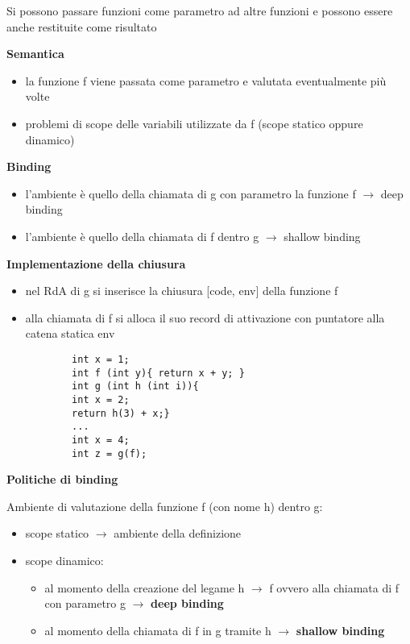 \documentclass{article}
\begin{document}
\begin{flushleft}

Si possono passare funzioni come parametro ad altre funzioni e possono essere anche restituite come risultato

\medskip

\textbf{Semantica}
\begin{itemize}
    \item la funzione f viene passata come parametro e valutata eventualmente più volte
    \item problemi di scope delle variabili utilizzate da f (scope statico oppure dinamico)
\end{itemize}

\medskip

\textbf{Binding}
\begin{itemize}
    \item l'ambiente è quello della chiamata di g con parametro la funzione f $\rightarrow$ deep binding
    \item l'ambiente è quello della chiamata di f dentro g $\rightarrow$ shallow binding
\end{itemize}

\textbf{Implementazione della chiusura}
\begin{itemize}
    \item nel RdA di g si inserisce la chiusura [code, env] della funzione f
    \item alla chiamata di f si alloca il suo record di attivazione con puntatore alla catena statica env
    \begin{lstlisting}
        int x = 1;
        int f (int y){ return x + y; }
        int g (int h (int i)){
        int x = 2;
        return h(3) + x;}
        ...
        int x = 4;
        int z = g(f);
    \end{lstlisting}
\end{itemize}

\medskip

\textbf{Politiche di binding}

Ambiente di valutazione della funzione f (con nome h) dentro g:
\begin{itemize}
    \item scope statico $\rightarrow$ ambiente della definizione
    \item scope dinamico: \begin{itemize}
        \item al momento della creazione del legame h $\rightarrow$ f ovvero alla chiamata di f con parametro g
              $\rightarrow$ \textbf{deep binding}
        \item al momento della chiamata di f in g tramite h $\rightarrow$ \textbf{shallow binding}
    \end{itemize}
\end{itemize}


\end{flushleft}
\end{document}
